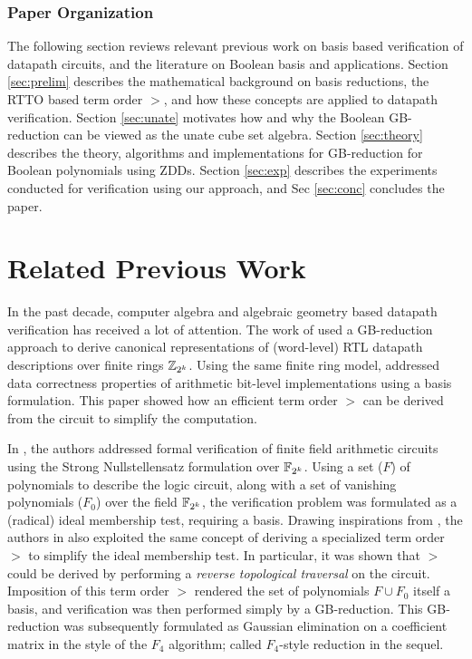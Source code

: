 \subsubsection{Paper Organization} The following section reviews
relevant previous work on \Grobner basis based verification of
datapath circuits, and the literature on Boolean \Grobner basis and
applications. Section \ref{sec:prelim} describes the mathematical
background on \Grobner basis reductions, the RTTO based term order
$>$, and how these concepts are applied to datapath
verification. Section \ref{sec:unate} motivates how and why the
Boolean GB-reduction can be viewed as the unate cube set
algebra. Section \ref{sec:theory} describes the theory, algorithms and
implementations for GB-reduction for Boolean polynomials using
ZDDs. Section \ref{sec:exp} describes the experiments conducted for
verification using our approach, and Sec \ref{sec:conc} concludes the
paper. 


\section{Related Previous Work}
\label{sec:prev}

In the past decade, computer algebra and algebraic geometry based
datapath verification has received a lot of attention.
The work of \cite{iccad05} used a GB-reduction
approach to derive canonical representations of (word-level) RTL
datapath descriptions over finite rings ${\mathbb{Z}}_{2^k}$. Using the same finite
ring model, \cite{wienand:cav08} addressed data correctness properties
of arithmetic bit-level implementations using a \Grobner basis
formulation. This paper showed how an efficient term order $>$
can be derived from the circuit to simplify the computation. 


In \cite{lv:tcad2013}, the authors addressed formal
verification of finite field arithmetic circuits using the Strong
Nullstellensatz formulation over ${\mathbb{F}}_{2^k}$. Using a set ($F$) of
polynomials to describe the logic circuit, along with a set of
vanishing polynomials ($F_0$) over the field ${\mathbb{F}}_{2^k}$, the verification
problem was formulated as a (radical) ideal membership test, requiring 
a \Grobner basis. Drawing inspirations from \cite{wienand:cav08},
the authors in \cite{lv:tcad2013} also exploited the same concept of deriving a
specialized term order $>$ to simplify the ideal membership test. In
particular, it was shown that $>$ could be derived by performing a
{\it reverse topological traversal} on the circuit. Imposition of this
term order $>$ rendered the set of polynomials $F\cup F_0$ itself a
\Grobner basis, and verification was then performed simply by a
GB-reduction. This GB-reduction was 
subsequently formulated as Gaussian elimination on a coefficient
matrix \cite{lv:tcad2013,pruss:tcad} in the style of the $F_4$
algorithm; called $F_4$-style reduction in the sequel. 

